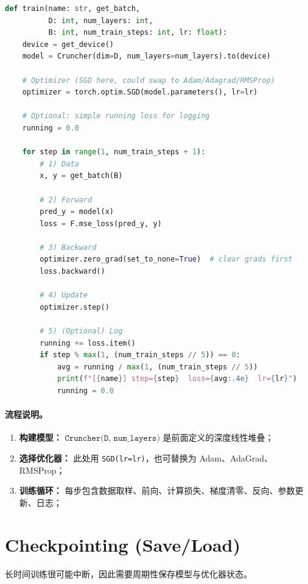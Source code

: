 \begin{lstlisting}[language=Python]
def train(name: str, get_batch,
          D: int, num_layers: int,
          B: int, num_train_steps: int, lr: float):
    device = get_device()
    model = Cruncher(dim=D, num_layers=num_layers).to(device)

    # Optimizer (SGD here, could swap to Adam/Adagrad/RMSProp)
    optimizer = torch.optim.SGD(model.parameters(), lr=lr)

    # Optional: simple running loss for logging
    running = 0.0

    for step in range(1, num_train_steps + 1):
        # 1) Data
        x, y = get_batch(B)

        # 2) Forward
        pred_y = model(x)
        loss = F.mse_loss(pred_y, y)

        # 3) Backward
        optimizer.zero_grad(set_to_none=True)  # clear grads first
        loss.backward()

        # 4) Update
        optimizer.step()

        # 5) (Optional) Log
        running += loss.item()
        if step % max(1, (num_train_steps // 5)) == 0:
            avg = running / max(1, (num_train_steps // 5))
            print(f"[{name}] step={step}  loss={avg:.4e}  lr={lr}")
            running = 0.0
\end{lstlisting}

\paragraph{流程说明。}
\begin{enumerate}
  \item \textbf{构建模型：} \(\texttt{Cruncher(D, num\_layers)}\) 是前面定义的深度线性堆叠；
  \item \textbf{选择优化器：} 此处用 \texttt{SGD(lr=lr)}，也可替换为 Adam、AdaGrad、RMSProp；
  \item \textbf{训练循环：} 每步包含数据取样、前向、计算损失、梯度清零、反向、参数更新、日志；
\end{enumerate}
  
\clearpage
\section{Checkpointing (Save/Load)}

长时间训练很可能中断，因此需要周期性保存模型与优化器状态。

